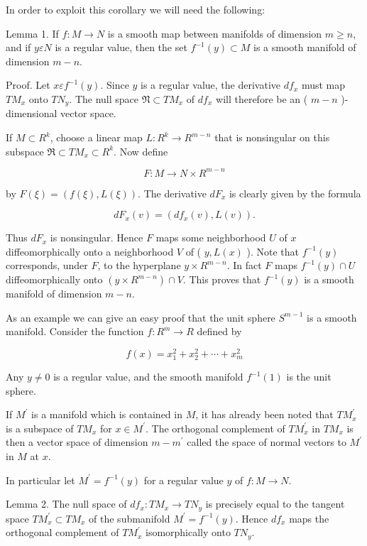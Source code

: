 \documentclass[10pt, letterpaper]{article}
\begin{document}
In order to exploit this corollary we will need the following:

Lemma 1. If $f: M \rightarrow N$ is a smooth map between manifolds of dimension $m \geq n$, and if $y \varepsilon N$ is a regular value, then the set $f^{-1}(y) \subset M$ is a smooth manifold of dimension $m-n$.

Proof. Let $x \varepsilon f^{-1}(y)$. Since $y$ is a regular value, the derivative $d f_{x}$ must map $T M_{x}$ onto $T N_{y}$. The null space $\mathfrak{N} \subset T M_{x}$ of $d f_{x}$ will therefore be an ( $m-n$ )-dimensional vector space.

If $M \subset R^{k}$, choose a linear map $L: R^{k} \rightarrow R^{m-n}$ that is nonsingular on this subspace $\Re \subset T M_{x} \subset R^{k}$. Now define

$$
F: M \rightarrow N \times R^{m-n}
$$

by $F(\xi)=(f(\xi), L(\xi))$. The derivative $d F_{x}$ is clearly given by the formula

$$
d F_{x}(v)=\left(d f_{x}(v), L(v)\right) .
$$

Thus $d F_{x}$ is nonsingular. Hence $F$ maps some neighborhood $U$ of $x$ diffeomorphically onto a neighborhood $V$ of ( $y, L(x)$ ). Note that $f^{-1}(y)$ corresponds, under $F$, to the hyperplane $y \times R^{m-n}$. In fact $F$ maps $f^{-1}(y) \cap U$ diffeomorphically onto $\left(y \times R^{m-n}\right) \cap V$. This proves that $f^{-1}(y)$ is a smooth manifold of dimension $m-n$.



As an example we can give an easy proof that the unit sphere $S^{m-1}$ is a smooth manifold. Consider the function $f: R^{m} \rightarrow R$ defined by

$$
f(x)=x_{1}^{2}+x_{2}^{2}+\cdots+x_{m}^{2}
$$

Any $y \neq 0$ is a regular value, and the smooth manifold $f^{-1}(1)$ is the unit sphere.

If $M^{\prime}$ is a manifold which is contained in $M$, it has already been noted that $T M_{x}^{\prime}$ is a subspace of $T M_{x}$ for $x \in M^{\prime}$. The orthogonal complement of $T M_{x}^{\prime}$ in $T M_{x}$ is then a vector space of dimension $m-m^{\prime}$ called the space of normal vectors to $M^{\prime}$ in $M$ at $x$.

In particular let $M^{\prime}=f^{-1}(y)$ for a regular value $y$ of $f: M \rightarrow N$.



Lemma 2. The null space of $d f_{x}: T M_{x} \rightarrow T N_{y}$ is precisely equal to the tangent space $T M_{x}^{\prime} \subset T M_{x}$ of the submanifold $M^{\prime}=f^{-1}(y)$. Hence $d f_{x}$ maps the orthogonal complement of $T M_{x}^{\prime}$ isomorphically onto $T N_{y}$.
\end{document}
